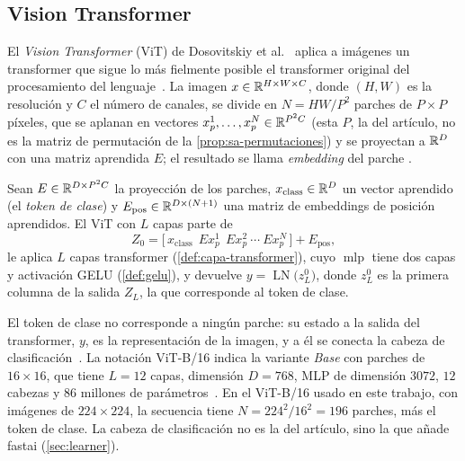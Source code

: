 \subsection{Vision Transformer}\label{sec:vit}

El \emph{Vision Transformer} (ViT) de Dosovitskiy et al.~\cite{dosovitskiy2021}
aplica a imágenes un transformer que sigue lo más fielmente posible el
transformer original del procesamiento del lenguaje~\cite[sec.~3]{dosovitskiy2021}.
La imagen $x\in\mathbb{R}^{H\times W\times C}$, donde $(H,W)$ es la resolución y $C$ el número de
canales, se divide en $N = HW/P^2$ parches de $P\times P$ píxeles, que
se aplanan en vectores $x_p^1,\dots,x_p^N\in\mathbb{R}^{P^2C}$ (esta $P$, la del
artículo, no es la matriz de permutación de la \cref{prop:sa-permutaciones}) y se proyectan a $\mathbb{R}^{D}$ con una matriz
aprendida $E$; el resultado se llama \emph{embedding} del parche
\cite[sec.~3.1]{dosovitskiy2021}.

\begin{definicion}\label{def:vit}
Sean $E\in\mathbb{R}^{D\times P^2C}$ la proyección de los parches,
$x_{\mathrm{class}}\in\mathbb{R}^{D}$ un vector aprendido (el \emph{token de clase}) y
$E_{\mathrm{pos}}\in\mathbb{R}^{D\times(N+1)}$ una matriz de embeddings de posición
aprendidos. El ViT con $L$ capas parte de
\[
  Z_0 = \bigl[\,x_{\mathrm{class}}\ \ Ex_p^1\ \ Ex_p^2\ \cdots\ Ex_p^N\,\bigr] + E_{\mathrm{pos}},
\]
le aplica $L$ capas transformer (\cref{def:capa-transformer}), cuyo
$\operatorname{mlp}$ tiene dos capas y activación GELU (\cref{def:gelu}), y
devuelve $y = \operatorname{LN}\bigl(z_L^{0}\bigr)$, donde $z_L^{0}$ es la
primera columna de la salida $Z_L$, la que corresponde al token de clase.
\end{definicion}

El token de clase no corresponde a ningún parche: su estado a la salida del
transformer, $y$, es la representación de la imagen, y a él se conecta la cabeza
de clasificación~\cite[sec.~3.1]{dosovitskiy2021}. La notación ViT-B/16 indica la
variante \emph{Base} con parches de $16\times16$, que tiene
$L = 12$ capas, dimensión $D = 768$, MLP de dimensión $3072$, $12$ cabezas y
$86$ millones de parámetros~\cite[tabla~1]{dosovitskiy2021}. En el ViT-B/16 usado en este trabajo, con
imágenes de $224\times224$, la secuencia tiene $N = 224^2/16^2 = 196$ parches,
más el token de clase. La cabeza de clasificación no es la del artículo, sino la
que añade fastai (\cref{sec:learner}).

